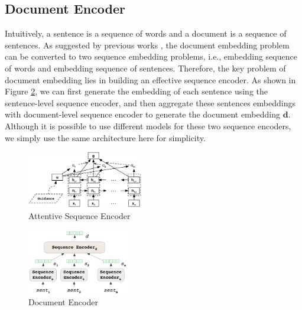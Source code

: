 \subsection{Document Encoder}
\label{sec_doc_encoder}
Intuitively, a sentence is a sequence of words and a document is a sequence of sentences. As suggested by previous works \cite{tang2015document,yang2016hierarchical}, the document embedding problem can be converted to two sequence embedding problems, i.e., embedding sequence of words and embedding sequence of sentences. Therefore, the key problem of document embedding lies in building an effective sequence encoder. As shown in Figure \ref{fig_doc_encoder}, we can first generate the embedding of each sentence using the sentence-level sequence encoder, and then aggregate these sentences embeddings with document-level sequence encoder to generate the document embedding $\mathbf{d}$. Although it is possible to use different models for these two sequence encoders, we simply use the same architecture here for simplicity.

\begin{figure}[htbp]
\begin{center}
\includegraphics[width=0.45\textwidth]{figures/attentive_seq_encoder.png}	
\caption{Attentive Sequence Encoder}
\label{fig_seq_encoder}
\end{center}
\end{figure}

\begin{figure}[htbp]
\begin{center}
\includegraphics[width=0.4\textwidth]{figures/document_encoder.png}	
\caption{Document Encoder}
\label{fig_doc_encoder}
\end{center}
\end{figure}

